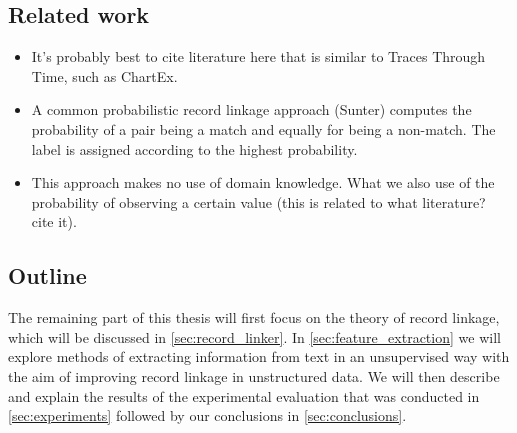 

\subsection{Related work}
\label{sec:related_work}

\begin{itemize}
    \item It's probably best to cite literature here that is similar to Traces Through Time, such as ChartEx.
    \item A common probabilistic record linkage approach (Sunter) computes the probability of a pair being a match and equally for being a non-match. The label is assigned according to the highest probability.
    \item This approach makes no use of domain knowledge. What we also use of the probability of observing a certain value (this is related to what literature? cite it).
\end{itemize}




\subsection{Outline}
\label{sec:outline}

The remaining part of this thesis will first focus on the theory of record linkage, which will be discussed in \cref{sec:record_linker}.
In \cref{sec:feature_extraction} we will explore methods of extracting information from text in an unsupervised way with the aim of improving record linkage in unstructured data.
We will then describe and explain the results of the experimental evaluation that was conducted in \cref{sec:experiments} followed by our conclusions in \cref{sec:conclusions}.